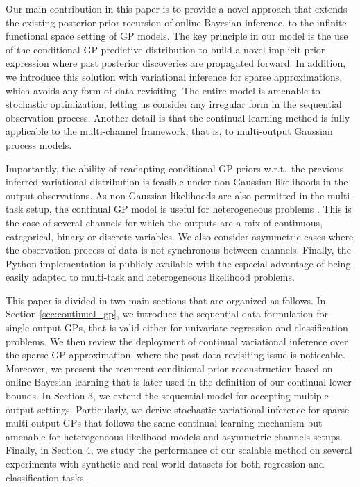 \documentclass[]{article}
\begin{document}
Our main contribution in this paper is to provide a novel approach that extends the existing posterior-prior recursion of online Bayesian inference, to the infinite functional space setting of GP models. The key principle in our model is the use of the conditional GP predictive distribution to build a novel implicit prior expression where past posterior discoveries are propagated forward. In addition, we introduce this solution with variational inference for sparse approximations, which avoids any form of data revisiting. The entire model is amenable to stochastic optimization, letting us consider any irregular form in the sequential observation process. Another detail is that the continual learning method is fully applicable to the multi-channel framework, that is, to multi-output Gaussian process models. 

Importantly, the ability of readapting conditional GP priors w.r.t.\ the previous inferred variational distribution is feasible under non-Gaussian likelihoods in the output observations. As non-Gaussian likelihoods are also permitted in the multi-task setup, the continual GP model is useful for heterogeneous problems \citep{morenomunoz2018}. This is the case of several channels for which the outputs are a mix of  continuous, categorical, binary or discrete variables. We also consider asymmetric cases where the observation process of data is not synchronous between channels. Finally, the Python implementation is publicly available with the especial advantage of being easily adapted to multi-task and heterogeneous likelihood problems.



This paper is divided in two main sections that are organized as follows. In Section \ref{sec:continual_gp}, we introduce the sequential data formulation for single-output GPs, that is valid either for univariate regression and classification problems. We then review the deployment of continual variational inference over the sparse GP approximation, where the past data revisiting issue is noticeable. Moreover, we present the recurrent conditional prior reconstruction based on online Bayesian learning that is later used in the definition of our continual lower-bounds. In Section 3, we extend the sequential model for accepting multiple output settings. Particularly, we derive stochastic variational inference for sparse multi-output GPs that follows the same continual learning mechanism but amenable for heterogeneous likelihood models and asymmetric channels setups. Finally, in Section 4, we study the performance of our scalable method on several experiments with synthetic and real-world datasets for both regression and classification tasks. 
\end{document}
